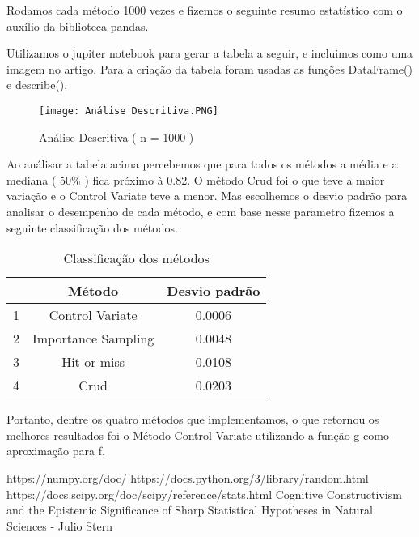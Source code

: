 \documentclass{article}
\begin{document}
Rodamos cada método 1000 vezes e fizemos o seguinte resumo estatístico com o auxílio da biblioteca pandas. 
\par 
Utilizamos o jupiter notebook para gerar a tabela a seguir, e incluimos como uma imagem no artigo. Para a criação da tabela foram usadas as funções DataFrame() e describe().

\hfill


\begin{figure}[!htb]
    \centering
    \texttt{[image: Análise Descritiva.PNG]}
    \caption{Análise Descritiva ( n = 1000 )}
    \label{fig:my_label}
\end{figure}

\hfill

\par
Ao análisar a tabela acima percebemos que para todos os métodos a média e a mediana ( 50\% ) fica próximo à 0.82. O método Crud foi o que teve a maior variação e o Control Variate teve a menor. Mas escolhemos o desvio padrão para analisar o desempenho de cada método, e com base nesse parametro fizemos a seguinte classificação dos métodos.

\hfill


\begin{table}[ht]
    \centering
    \begin{tabular}{c|c|c}
         & Método & Desvio padrão \\
         \hline
        1 & Control Variate & 0.0006 \\
        \hline
        2 & Importance Sampling & 0.0048 \\
        \hline
        3 & Hit or miss & 0.0108 \\
        \hline
        4 & Crud & 0.0203 \\
        
    \end{tabular}
    \caption{Classificação dos métodos}
    \label{tab:my_label}
\end{table}

\hfill

\par 
Portanto, dentre os quatro métodos que implementamos, o que retornou os melhores resultados foi o Método Control Variate utilizando a função g como aproximação para f.

\hfill


\begin{thebibliography}{4}

https://numpy.org/doc/
https://docs.python.org/3/library/random.html
https://docs.scipy.org/doc/scipy/reference/stats.html
Cognitive Constructivism and the Epistemic Significance of Sharp Statistical Hypotheses in Natural Sciences - Julio Stern

\end{thebibliography}

    
\end{document}
